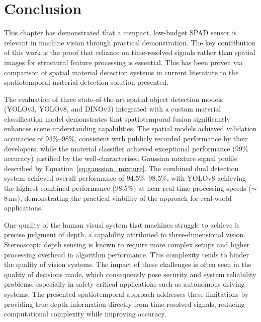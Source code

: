 \documentclass[12pt,a4paper,oneside]{report}
\let\oldsection\section
\renewcommand{\section}{\clearpage\oldsection}
\begin{document}
\newpage
\section{Conclusion}
\label{sec:conclusion_chapter5}

This chapter has demonstrated that a compact, low-budget SPAD sensor is relevant in machine vision through practical demonstration. The key contribution of this work is the proof that reliance on time-resolved signals rather than spatial images for structural feature processing is essential. This has been proven via comparison of spatial material detection systems in current literature to the spatiotemporal material detection solution presented.

The evaluation of three state-of-the-art spatial object detection models (YOLOv3, YOLOv8, and DINOv3) integrated with a custom material classification model demonstrates that spatiotemporal fusion significantly enhances scene understanding capabilities. The spatial models achieved validation accuracies of 94\%--98\%, consistent with publicly recorded performance by their developers, while the material classifier achieved exceptional performance (99\% accuracy) justified by the well-characterised Gaussian mixture signal profile described by Equation~\eqref{eq:gaussian_mixture}. The combined dual detection system achieved overall performance of 94.5\%--98.5\%, with YOLOv8 achieving the highest combined performance (98.5\%) at near-real-time processing speeds ($\sim$8\,ms), demonstrating the practical viability of the approach for real-world applications.

One quality of the human visual system that machines struggle to achieve is precise judgment of depth, a capability attributed to three-dimensional vision. Stereoscopic depth sensing is known to require more complex setups and higher processing overhead in algorithm performance. This complexity tends to hinder the quality of vision systems. The impact of these challenges is often seen in the quality of decisions made, which consequently pose security and system reliability problems, especially in safety-critical applications such as autonomous driving systems. The presented spatiotemporal approach addresses these limitations by providing true depth information directly from time-resolved signals, reducing computational complexity while improving accuracy.
\end{document}
